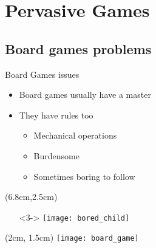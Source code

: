 \section{Pervasive Games}
\subsection{Board games problems}
\begin{frame}{Board Games issues}

  \begin{itemize}
   \item<1-> Board games usually have a master
   \item<2-> They have rules too
   \begin{itemize}
    \item Mechanical operations
    \item Burdensome
    \item Sometimes boring to follow
   \end{itemize}
  \end{itemize}

  \begin{textblock*}{5cm}(6.8cm,2.5cm)
    \begin{itemize}
     \item[]<3-> \texttt{[image: bored\_child]}
    \end{itemize}
  \end{textblock*}
  
  \begin{textblock*}{5cm}(2cm, 1.5cm)
    \texttt{[image: board\_game]}
  \end{textblock*}


\end{frame}
